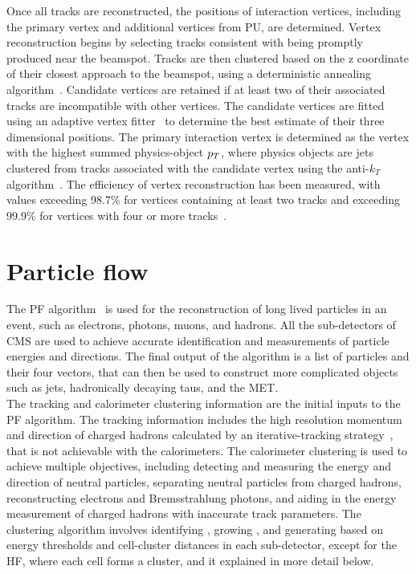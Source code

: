 Once all tracks are reconstructed, the positions of interaction vertices, including the primary vertex and additional vertices from \ac{PU}, are determined. 
Vertex reconstruction begins by selecting tracks consistent with being promptly produced near the beamspot. 
Tracks are then clustered based on the z coordinate of their closest approach to the beamspot, using a deterministic annealing algorithm~\cite{Rose:1998dzq}. 
Candidate vertices are retained if at least two of their associated tracks are incompatible with other vertices. 
The candidate vertices are fitted using an adaptive vertex fitter~\cite{Fruhwirth:2007hz} to determine the best estimate of their three dimensional positions. 
The primary interaction vertex is determined as the vertex with the highest summed physics-object $p_{T}$, where physics objects are jets clustered from tracks associated with the candidate vertex using the anti-$k_T$ algorithm~\cite{Fruhwirth:2007hz}.
The efficiency of vertex reconstruction has been measured, with values exceeding 98.7\% for vertices containing at least two tracks and exceeding 99.9\% for vertices with four or more tracks~\cite{CMS:2010mua}. 

\section{Particle flow}

The \ac{PF} algorithm~\cite{PF_CMS,CMS:2010byl,CMS:2010eua} is used for the reconstruction of long lived particles in an event, such as electrons, photons, muons, and hadrons. 
All the sub-detectors of \ac{CMS} are used to achieve accurate identification and measurements of particle energies and directions. 
The final output of the algorithm is a list of particles and their four vectors, that can then be used to construct more complicated objects such as jets, hadronically decaying taus, and the \ac{MET}.\\

The tracking and calorimeter clustering information are the initial inputs to the \ac{PF} algorithm.
The tracking information includes the high resolution momentum and direction of charged hadrons calculated by an iterative-tracking strategy~\cite{Adam:934067}, that is not achievable with the calorimeters.
The calorimeter clustering is used to achieve multiple objectives, including detecting and measuring the energy and direction of neutral particles, separating neutral particles from charged hadrons, reconstructing electrons and Bremsstrahlung photons, and aiding in the energy measurement of charged hadrons with inaccurate track parameters. 
The clustering algorithm involves identifying , growing , and generating  based on energy thresholds and cell-cluster distances in each sub-detector, except for the \ac{HF}, where each cell forms a cluster, and it explained in more detail below. \\

